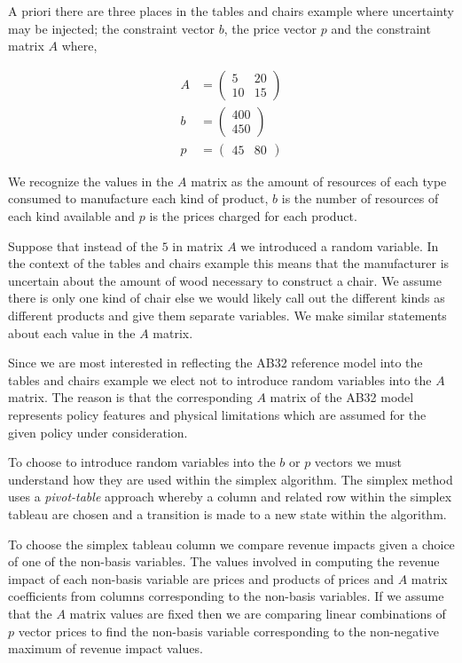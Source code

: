 A priori there are three places in the tables and chairs example where
uncertainty may be injected; the constraint vector $b$, the price
vector $p$ and the constraint matrix $A$ where,

\begin{align*}
A &= \begin{pmatrix}5&20\\10&15\end{pmatrix}\\
b &= \begin{pmatrix}400\\450\end{pmatrix}\\
p &= \begin{pmatrix}45&80\end{pmatrix}
\end{align*}

We recognize the values in the $A$ matrix as the amount of resources
of each type consumed to manufacture each kind of product, $b$ is the
number of resources of each kind available and $p$ is the prices
charged for each product.

Suppose that instead of the $5$ in matrix $A$ we introduced a random
variable. In the context of the tables and chairs example this means
that the manufacturer is uncertain about the amount of wood necessary
to construct a chair. We assume there is only one kind of chair else we
would likely call out the different kinds as different products and
give them separate variables. We make similar statements about each
value in the $A$ matrix. 

Since we are most interested in reflecting the AB32 reference model
into the tables and chairs example we elect not to introduce random
variables into the $A$ matrix. The reason is that the corresponding
$A$ matrix of the AB32 model represents policy features and physical
limitations which are assumed for the given policy under
consideration. 

To choose to introduce random variables into the $b$ or $p$ vectors we
must understand how they are used within the simplex algorithm. The
simplex method uses a \emph{pivot-table} approach whereby a column and
related row within the simplex tableau are chosen and a transition is
made to a new state within the algorithm. 

To choose the simplex tableau column we compare revenue impacts given
a choice of one of the non-basis variables. The values involved in
computing the revenue impact of each non-basis variable are prices and
products of prices and $A$ matrix coefficients from columns
corresponding to the non-basis variables. If we assume that the $A$
matrix values are fixed then we are comparing linear combinations of
$p$ vector prices to find the  non-basis variable corresponding to the
non-negative maximum of revenue impact values.

